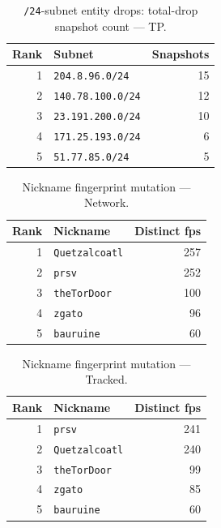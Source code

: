 \documentclass[conference]{IEEEtran}
\begin{document}
\begin{table}[H]
\caption{\texttt{/24}-subnet entity drops: total-drop snapshot count --- TP.}
\begin{center}\small
\begin{tabular}{|r|l|r|}
\hline
\textbf{Rank} & \textbf{Subnet} & \textbf{Snapshots} \\ \hline
1 & \texttt{204.8.96.0/24} & 15 \\ \hline
2 & \texttt{140.78.100.0/24} & 12 \\ \hline
3 & \texttt{23.191.200.0/24} & 10 \\ \hline
4 & \texttt{171.25.193.0/24} & 6 \\ \hline
5 & \texttt{51.77.85.0/24} & 5 \\ \hline
\end{tabular}
\label{tab:subnetdrop_total_third_party_probe}
\end{center}\end{table}
 
\begin{table}[H]
\caption{Nickname fingerprint mutation --- Network.}
\begin{center}\small
\begin{tabular}{|r|l|r|}
\hline
\textbf{Rank} & \textbf{Nickname} & \textbf{Distinct fps} \\ \hline
1 & \texttt{Quetzalcoatl} & 257 \\ \hline
2 & \texttt{prsv} & 252 \\ \hline
3 & \texttt{theTorDoor} & 100 \\ \hline
4 & \texttt{zgato} & 96 \\ \hline
5 & \texttt{bauruine} & 60 \\ \hline
\end{tabular}
\label{tab:fpchg_network}
\end{center}\end{table}
 
\begin{table}[H]
\caption{Nickname fingerprint mutation --- Tracked.}
\begin{center}\small
\begin{tabular}{|r|l|r|}
\hline
\textbf{Rank} & \textbf{Nickname} & \textbf{Distinct fps} \\ \hline
1 & \texttt{prsv} & 241 \\ \hline
2 & \texttt{Quetzalcoatl} & 240 \\ \hline
3 & \texttt{theTorDoor} & 99 \\ \hline
4 & \texttt{zgato} & 85 \\ \hline
5 & \texttt{bauruine} & 60 \\ \hline
\end{tabular}
\label{tab:fpchg_tracked}
\end{center}\end{table}
 
\end{document}
